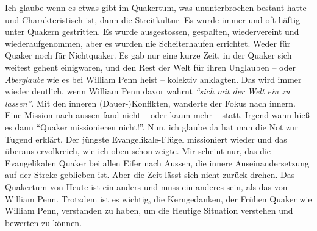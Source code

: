 \medskip

Ich glaube wenn es etwas gibt im Quakertum, was ununterbrochen bestant hatte und
Charakteristisch ist, dann die Streitkultur. Es wurde immer und oft häftig unter
Quakern gestritten. Es wurde ausgestossen, gespalten, wiedervereint und
wiederaufgenommen, aber es wurden nie Scheiterhaufen errichtet. Weder für Quaker
noch für Nichtquaker. Es gab nur eine kurze Zeit, in der Quaker sich weitest
gehent einigwaren, und den Rest der Welt für ihren Unglauben -- oder
\textit{Aberglaube} wie es bei William Penn heist -- kolektiv anklagten. Das
wird immer wieder deutlich, wenn William Penn davor wahrnt \textit{"`sich mit
der Welt ein zu lassen"'}. Mit den inneren (Dauer-)Konflkten, wanderte der Fokus
nach innern. Eine Mission nach aussen fand nicht -- oder kaum mehr -- statt.
Irgend wann hieß es dann "`Quaker missionieren nicht!"'. Nun, ich glaube da hat
man die Not zur Tugend erklärt. Der jüngste Evangelikale-Flügel missioniert
wieder und das überaus ervolkreich, wie ich oben schon zeigte. Mir scheint nur,
das die Evangelikalen Quaker bei allen Eifer nach Aussen, die innere
Auseinandersetzung auf der Streke geblieben ist. Aber die Zeit lässt sich nicht zurück drehen. Das Quakertum von Heute ist ein anders und muss ein anderes sein, als das von William Penn. Trotzdem ist es wichtig, die Kerngedanken, der Frühen Quaker wie William Penn, verstanden zu haben, um die Heutige Situation verstehen und bewerten zu können.



